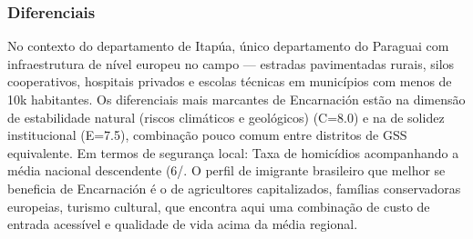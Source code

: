\subsubsection*{Diferenciais}\label{dif-encarnacion-0701}
No contexto do departamento de Itapúa, único departamento do Paraguai com infraestrutura de nível europeu no campo — estradas pavimentadas rurais, silos cooperativos, hospitais privados e escolas técnicas em municípios com menos de 10k habitantes. Os diferenciais mais marcantes de Encarnación estão na dimensão de estabilidade natural (riscos climáticos e geológicos) (C=8.0) e na de solidez institucional (E=7.5), combinação pouco comum entre distritos de GSS equivalente. Em termos de segurança local: Taxa de homicídios acompanhando a média nacional descendente (6/. O perfil de imigrante brasileiro que melhor se beneficia de Encarnación é o de agricultores capitalizados, famílias conservadoras europeias, turismo cultural, que encontra aqui uma combinação de custo de entrada acessível e qualidade de vida acima da média regional.
